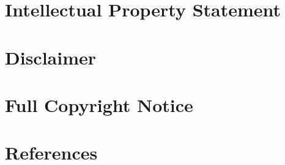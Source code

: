 \documentclass[10pt,a4paper]{article}
\begin{document}
\section{Intellectual Property Statement}


\section{Disclaimer}


\section{Full Copyright Notice}


\section{References}



\end{document}
